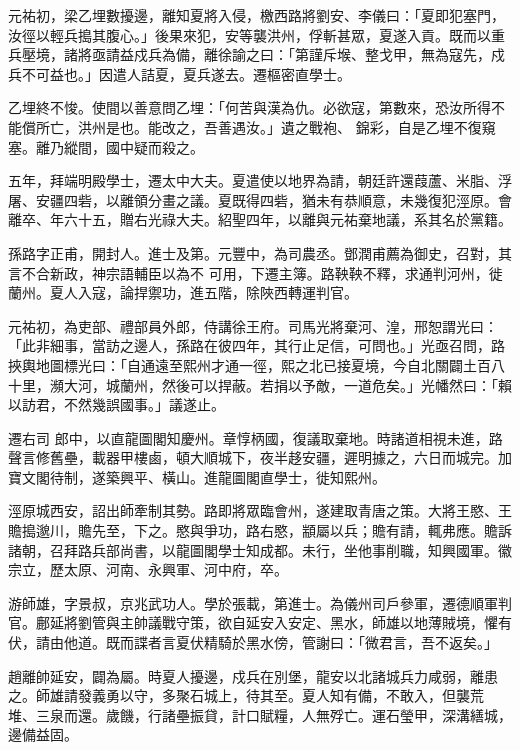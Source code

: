\begin{pinyinscope}
 元祐初，梁乙埋數擾邊，離知夏將入侵，檄西路將劉安、李儀曰：「夏即犯塞門，汝徑以輕兵搗其腹心。」後果來犯，安等襲洪州，俘斬甚眾，夏遂入貢。既而以重兵壓境，諸將亟請益戍兵為備，離徐諭之曰：「第謹斥堠、整戈甲，無為寇先，戍兵不可益也。」因遣人詰夏，夏兵遂去。遷樞密直學士。



 乙埋終不悛。使間以善意問乙埋：「何苦與漢為仇。必欲寇，第數來，恐汝所得不能償所亡，洪州是也。能改之，吾善遇汝。」遺之戰袍、
 錦彩，自是乙埋不復窺塞。離乃縱間，國中疑而殺之。



 五年，拜端明殿學士，遷太中大夫。夏遣使以地界為請，朝廷許還葭蘆、米脂、浮屠、安疆四砦，以離領分畫之議。夏既得四砦，猶未有恭順意，未幾復犯涇原。會離卒、年六十五，贈右光祿大夫。紹聖四年，以離與元祐棄地議，系其名於黨籍。



 孫路字正甫，開封人。進士及第。元豐中，為司農丞。鄧潤甫薦為御史，召對，其言不合新政，神宗語輔臣以為不
 可用，下遷主簿。路鞅鞅不釋，求通判河州，徙蘭州。夏人入寇，論捍禦功，進五階，除陜西轉運判官。



 元祐初，為吏部、禮部員外郎，侍講徐王府。司馬光將棄河、湟，邢恕謂光曰：「此非細事，當訪之邊人，孫路在彼四年，其行止足信，可問也。」光亟召問，路挾輿地圖標光曰：「自通遠至熙州才通一徑，熙之北已接夏境，今自北關闢土百八十里，瀕大河，城蘭州，然後可以捍蔽。若捐以予敵，一道危矣。」光幡然曰：「賴以訪君，不然幾誤國事。」議遂止。



 遷右司
 郎中，以直龍圖閣知慶州。章惇柄國，復議取棄地。時諸道相視未進，路聲言修舊壘，載器甲樓鹵，頓大順城下，夜半趍安疆，遲明據之，六日而城完。加寶文閣待制，遂築興平、橫山。進龍圖閣直學士，徙知熙州。



 涇原城西安，詔出師牽制其勢。路即將眾臨會州，遂建取青唐之策。大將王愍、王贍搗邈川，贍先至，下之。愍與爭功，路右愍，顓屬以兵；贍有請，輒弗應。贍訴諸朝，召拜路兵部尚書，以龍圖閣學士知成都。未行，坐他事削職，知興國軍。徽
 宗立，歷太原、河南、永興軍、河中府，卒。



 游師雄，字景叔，京兆武功人。學於張載，第進士。為儀州司戶參軍，遷德順軍判官。鄜延將劉管與主帥議戰守策，欲自延安入安定、黑水，師雄以地薄賊境，懼有伏，請由他道。既而諜者言夏伏精騎於黑水傍，管謝曰：「微君言，吾不返矣。」



 趙離帥延安，闢為屬。時夏人擾邊，戍兵在別堡，龍安以北諸城兵力咸弱，離患之。師雄請發義勇以守，多聚石城上，待其至。夏人知有備，不敢入，但襲荒
 堆、三泉而還。歲饑，行諸壘振貸，計口賦糧，人無殍亡。運石瑩甲，深溝繕城，邊備益固。




\end{pinyinscope}
